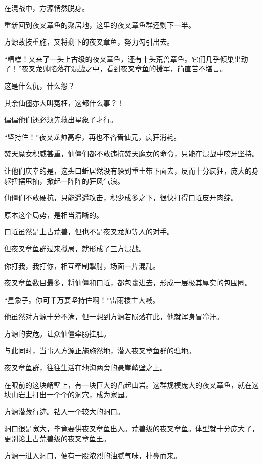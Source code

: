 
\begin{this_body}

在混战中，方源悄然脱身。

重新回到夜叉章鱼的聚居地，这里的夜叉章鱼群还剩下一半。

方源故技重施，又将剩下的夜叉章鱼，努力勾引出去。

“糟糕！又来了一头上古级的夜叉章鱼，还有十头荒兽章鱼。它们几乎倾巢出动了！”夜叉龙帅陷落在混战之中，看到夜叉章鱼的援军，简直苦不堪言。

这是什么仇，什么怨？

其余仙僵亦大叫冤枉，这都什么事？！

偏偏他们还必须先救出星象子才行。

“坚持住！”夜叉龙帅高呼，再也不吝啬仙元，疯狂消耗。

焚天魔女积威甚重，仙僵们都不敢违抗焚天魔女的命令，只能在混战中咬牙坚持。

让他们庆幸的是，这头口蚯居然没有躲到重土带下面去，反而十分疯狂，庞大的身躯扭摆甩抽，掀起一阵阵的狂风气浪。

仙僵们不敢硬抗，只能遥遥攻击，积少成多之下，很快打得口蚯皮开肉绽。

原本这个局势，是相当清晰的。

口蚯虽然是上古荒兽，但也不是夜叉龙帅等人的对手。

但夜叉章鱼群过来搅局，就形成了三方混战。

你打我，我打你，相互牵制掣肘，场面一片混乱。

夜叉章鱼数目最多，将仙僵和口蚯，都包裹进去，形成一层极其厚实的包围圈。

“星象子。你可千万要坚持住啊！”雷雨楼主大喊。

他虽然对方源十分不满，但一想到方源若陨落在此，他就浑身冒冷汗。

方源的安危。让众仙僵牵肠挂肚。

与此同时，当事人方源正施施然地，潜入夜叉章鱼群的驻地。

夜叉章鱼群，往往生活在地沟两旁的悬崖峭壁之上。

在眼前的这块峭壁上，有一块巨大的凸起山岩。这群规模庞大的夜叉章鱼，就在这块山岩上打出一个个的洞穴，成为家园。

方源潜藏行迹。钻入一个较大的洞口。

洞口很是宽大，毕竟要供夜叉章鱼出入。荒兽级的夜叉章鱼。体型就十分庞大了，更别论上古荒兽级的夜叉章鱼王。

方源一进入洞口，便有一股浓烈的油腻气味，扑鼻而来。


\end{this_body}
